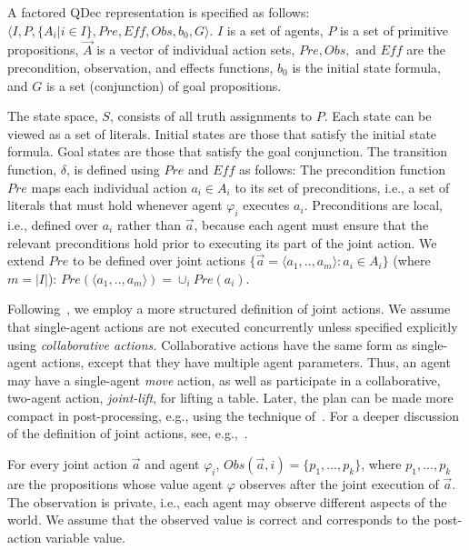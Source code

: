 \documentclass[letterpaper]{article}
\theoremstyle{definition}
\begin{document}
A factored QDec representation is specified as follows: $\langle I,P,\{A_i | i\in I\},\mathit{Pre},\mathit{Eff},\mathit{Obs},b_0,G\rangle$. $I$ is a set of agents, $P$ is a set of primitive propositions, $\vec{A}$ is a vector of individual action sets,  $\mathit{Pre, Obs,} \text{ and } \mathit{Eff}$ are the precondition, observation, and effects functions,
$b_0$ is the initial state formula, and $G$ is a set (conjunction) of goal propositions.


The state space, $S$, consists of all truth assignments to $P$. Each state can be viewed as a set of literals. Initial states are those that satisfy the initial state formula. Goal states are those that satisfy the goal conjunction.
The transition function,
$\delta$, is defined using  $\mathit{Pre}$ and  $\mathit{Eff}$ as follows:
The precondition function $\mathit{Pre}$ maps each individual action $a_i\in A_i$ to its set of preconditions, i.e., a set of literals that must
hold whenever agent $\varphi_i$ executes $a_i$. Preconditions are local, i.e., defined over $a_i$ rather than $\vec{a}$, because each agent must ensure that the relevant preconditions hold prior to executing its part of the joint action. We extend $\mathit{Pre}$ to be defined over joint actions $\{\vec{a}=\langle a_1,..,a_m\rangle : a_i \in A_i\}$ (where $m=|I|$):
$\mathit{Pre}(\langle a_1,..,a_m\rangle) = \cup_i \mathit{Pre}(a_i)$.

Following~\citet{IMAP}, we employ a more structured definition of joint actions.
We assume that single-agent actions are not executed concurrently unless specified explicitly using
{\em collaborative actions.} Collaborative actions have the same form as single-agent actions, except that they have multiple agent parameters.
Thus, an agent may have a single-agent {\em move} action, as well as participate in a
collaborative, two-agent action, {\em joint-lift}, for lifting a table.
Later, the plan can be made more
compact in post-processing, e.g., using the technique of~\citet{CJR14}. For a deeper discussion of the definition of joint actions, see, e.g.,~\citep{ShekharB18,ShekharB20}.

For every joint action $\vec{a}$ and agent $\varphi_i$, $\mathit{Obs}(\vec{a},i)=\{p_1,\ldots,p_k\}$, where $p_1,...,p_k$ are the propositions whose value agent $\varphi$ observes after the joint execution of $\vec{a}$. The observation is private, i.e., each agent may observe different aspects of the world. We assume that the observed value is correct and corresponds to the post-action variable value.
\end{document}
